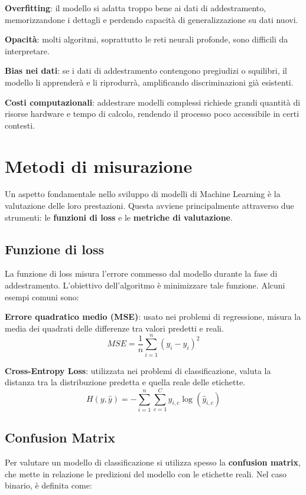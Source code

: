 \begin{compactitemize}
    \item \textbf{Overfitting}: il modello si adatta troppo bene ai dati di addestramento, memorizzandone i dettagli e perdendo capacità di generalizzazione su dati nuovi.
    \item \textbf{Opacità}: molti algoritmi, soprattutto le reti neurali profonde, sono difficili da interpretare.
    \item \textbf{Bias nei dati}: se i dati di addestramento contengono pregiudizi o squilibri, il modello li apprenderà e li riprodurrà, amplificando discriminazioni già esistenti.
    \item \textbf{Costi computazionali}: addestrare modelli complessi richiede grandi quantità di risorse hardware e tempo di calcolo, rendendo il processo poco accessibile in certi contesti.
\end{compactitemize}

\section{Metodi di misurazione}
Un aspetto fondamentale nello sviluppo di modelli di Machine Learning è la valutazione delle loro prestazioni. Questa avviene principalmente attraverso due strumenti: le \textbf{funzioni di loss} e le \textbf{metriche di valutazione}.


\subsection{Funzione di loss}
La funzione di loss misura l’errore commesso dal modello durante la fase di addestramento. L’obiettivo dell’algoritmo è minimizzare tale funzione. Alcuni esempi comuni sono:


\begin{compactitemize}
    \item \textbf{Errore quadratico medio (MSE)}: usato nei problemi di regressione, misura la media dei quadrati delle differenze tra valori predetti e reali.
    \[
    MSE = \frac{1}{n} \sum_{i=1}^{n} (y_i - \hat{y}_i)^2
    \]
    \item \textbf{Cross-Entropy Loss}: utilizzata nei problemi di classificazione, valuta la distanza tra la distribuzione predetta e quella reale delle etichette.
    \[
    H(y, \hat{y}) = - \sum_{i=1}^{n} \sum_{c=1}^{C} y_{i,c} \log(\hat{y}_{i,c})
    \]
\end{compactitemize}

\subsection{Confusion Matrix}
Per valutare un modello di classificazione si utilizza spesso la \textbf{confusion matrix}, che mette in relazione le predizioni del modello con le etichette reali. Nel caso binario, è definita come:

